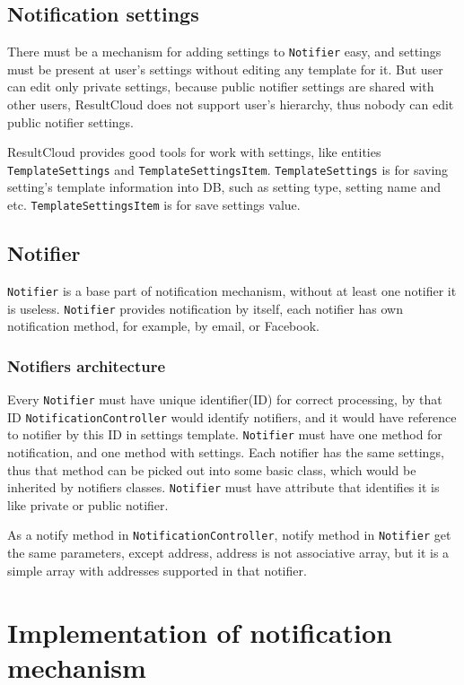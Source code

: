 \section{Notification settings}

There must be a mechanism for adding settings to \texttt{Notifier} easy, and settings must be present at user's settings without editing any template for it. But user can edit only private settings, because public notifier settings are shared with other users, ResultCloud does not support user's hierarchy, thus nobody can edit public notifier settings.

ResultCloud provides good tools for work with settings, like entities \texttt{TemplateSettings} and \texttt{TemplateSettingsItem}. \texttt{TemplateSettings} is for saving setting's template information into DB, such as setting type, setting name and etc. \texttt{TemplateSettingsItem} is for save settings value.

\section{Notifier}

\texttt{Notifier} is a base part of notification mechanism, without at least one notifier it is useless. \texttt{Notifier} provides notification by itself, each notifier has own notification method, for example, by email, or Facebook.

\subsection{Notifiers architecture}

Every \texttt{Notifier} must have unique identifier(ID) for correct processing, by that ID \texttt{Notifica\-tion\-Controller} would identify notifiers, and it would have reference to notifier by this ID in settings template. \texttt{Notifier} must have one method for notification, and one method with settings. Each notifier has the same settings, thus that method can be picked out into some basic class, which would be inherited by notifiers classes. \texttt{Notifier} must have attribute that identifies it is like private or public notifier.

As a notify method in \texttt{NotificationController}, notify method in \texttt{Notifier} get the same parameters, except address, address is not associative array, but it is a simple array with addresses supported in that notifier. 

\chapter{Implementation of notification mechanism}
\label{ch:notification_implement}

